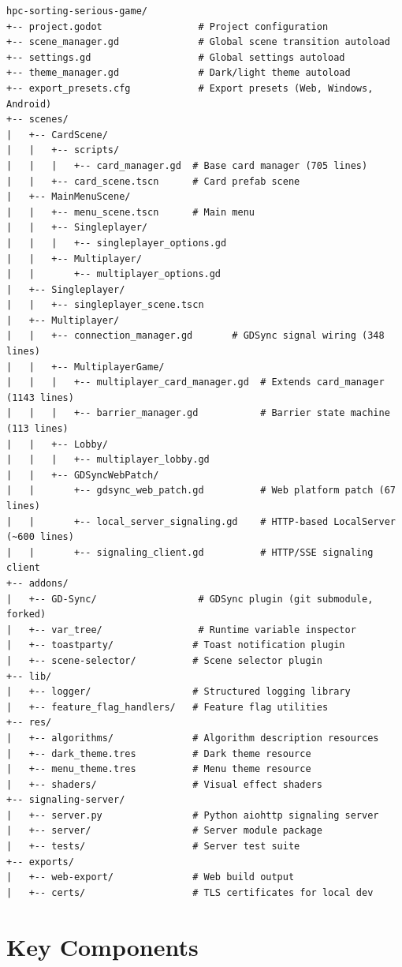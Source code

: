 \begin{verbatim}
hpc-sorting-serious-game/
+-- project.godot                 # Project configuration
+-- scene_manager.gd              # Global scene transition autoload
+-- settings.gd                   # Global settings autoload
+-- theme_manager.gd              # Dark/light theme autoload
+-- export_presets.cfg            # Export presets (Web, Windows, Android)
+-- scenes/
|   +-- CardScene/
|   |   +-- scripts/
|   |   |   +-- card_manager.gd  # Base card manager (705 lines)
|   |   +-- card_scene.tscn      # Card prefab scene
|   +-- MainMenuScene/
|   |   +-- menu_scene.tscn      # Main menu
|   |   +-- Singleplayer/
|   |   |   +-- singleplayer_options.gd
|   |   +-- Multiplayer/
|   |       +-- multiplayer_options.gd
|   +-- Singleplayer/
|   |   +-- singleplayer_scene.tscn
|   +-- Multiplayer/
|   |   +-- connection_manager.gd       # GDSync signal wiring (348 lines)
|   |   +-- MultiplayerGame/
|   |   |   +-- multiplayer_card_manager.gd  # Extends card_manager (1143 lines)
|   |   |   +-- barrier_manager.gd           # Barrier state machine (113 lines)
|   |   +-- Lobby/
|   |   |   +-- multiplayer_lobby.gd
|   |   +-- GDSyncWebPatch/
|   |       +-- gdsync_web_patch.gd          # Web platform patch (67 lines)
|   |       +-- local_server_signaling.gd    # HTTP-based LocalServer (~600 lines)
|   |       +-- signaling_client.gd          # HTTP/SSE signaling client
+-- addons/
|   +-- GD-Sync/                  # GDSync plugin (git submodule, forked)
|   +-- var_tree/                 # Runtime variable inspector
|   +-- toastparty/              # Toast notification plugin
|   +-- scene-selector/          # Scene selector plugin
+-- lib/
|   +-- logger/                  # Structured logging library
|   +-- feature_flag_handlers/   # Feature flag utilities
+-- res/
|   +-- algorithms/              # Algorithm description resources
|   +-- dark_theme.tres          # Dark theme resource
|   +-- menu_theme.tres          # Menu theme resource
|   +-- shaders/                 # Visual effect shaders
+-- signaling-server/
|   +-- server.py                # Python aiohttp signaling server
|   +-- server/                  # Server module package
|   +-- tests/                   # Server test suite
+-- exports/
|   +-- web-export/              # Web build output
|   +-- certs/                   # TLS certificates for local dev
\end{verbatim}

\section{Key Components}
\label{app:b:components}

